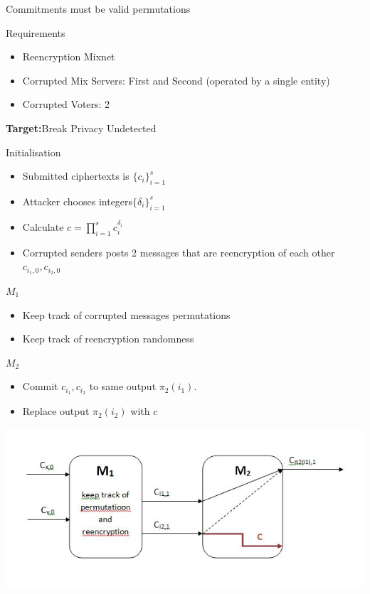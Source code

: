 \documentclass{beamer}
\begin{document}
\begin{frame}[allowframebreaks]{Commitments must be valid permutations}

\begin{block}{Requirements}
\begin{itemize}
\item Reencryption Mixnet
\item Corrupted Mix Servers: First and Second (operated by a single entity)
\item Corrupted Voters: 2
\end{itemize}
\textbf{Target:}Break Privacy Undetected
\end{block}


\begin{block}{Initialisation}
\begin{itemize}
\item Submitted ciphertexts is $\{c_i\}_{i=1}^s$
\item Attacker chooses integers$\{\delta_i\}_{i=1}^s$
\item Calculate $c=\prod_{i=1}^s c_i^{\delta_i}$
\item Corrupted senders posts 2 messages that are reencryption of each other $c_{i_1,0},c_{i_2,0}$
\end{itemize}
\end{block}

\begin{block}{$M_1$}
\begin{itemize}
\item Keep track of corrupted messages permutations
\item Keep track of reencryption randomness
\end{itemize}
\end{block}

\begin{block}{$M_2$}
\begin{itemize}
\item Commit $c_{i_1},c_{i_2}$ to same output $\pi_2(i_1)$.
\item Replace output $\pi_2(i_2)$ with $c$
\end{itemize}
\end{block}

\begin{center}
\includegraphics[scale=0.4]{rpc.jpg}
\end{center}


\end{frame}
\end{document}
